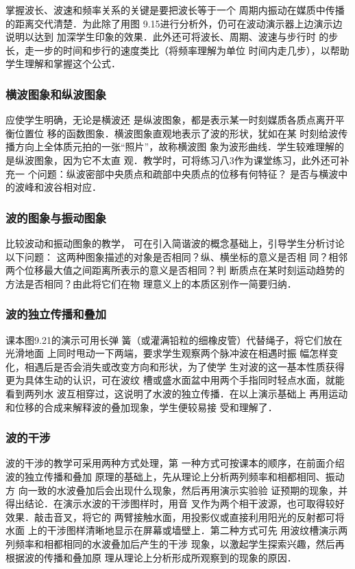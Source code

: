 掌握波长、波速和频率关系的关键是要把波长等于一个
周期内振动在媒质中传播的距离交代清楚．为此除了用图
9.15进行分析外，仍可在波动演示器上边演示边说明以达到
加深学生印象的效果．此外还可将波长、周期、波速与步行时
的步长，走一步的时间和步行的速度类比（将频率理解为单位
时间内走几步），以帮助学生理解和掌握这个公式．

\subsubsection{横波图象和纵波图象}

应使学生明确，无论是横波还
是纵波图象，都是表示某一时刻媒质各质点离开平衡位置位
移的函数图象．横波图象直观地表示了波的形状，犹如在某
时刻给波传播方向上全体质元拍的一张“照片”，故称横波图
象为波形曲线．学生较难理解的是纵波图象，因为它不太直
观．教学时，可将练习八3作为课堂练习，此外还可补充一
个问题：纵波密部中央质点和疏部中央质点的位移有何特征？
是否与横波中的波峰和波谷相对应．

\subsubsection{波的图象与振动图象} 

比较波动和振动图象的教学，
可在引入简谐波的概念基础上，引导学生分析讨论以下问题：
这两种图象描述的对象是否相同？纵、横坐标的意义是否相
同？相邻两个位移最大值之间距离所表示的意义是否相同？判
断质点在某时刻运动趋势的方法是否相同？由此将它们在物
理意义上的本质区别作一简要归纳．

\subsubsection{波的独立传播和叠加} 

课本图9.21的演示可用长弹
簧（或灌满铅粒的细橡皮管）代替绳子，将它们放在光滑地面
上同时甩动一下两端，要求学生观察两个脉冲波在相遇时振
幅怎样变化，相遇后是否会消失或改变方向和形状，为了使学
生对波的这一基本性质获得更为具体生动的认识，可在波纹
槽或盛水面盆中用两个手指同时轻点水面，就能看到两列水
波互相穿过，这说明了水波的独立传播．在以上演示基础上
再用运动和位移的合成来解释波的叠加现象，学生便较易接
受和理解了．

\subsubsection{波的干涉} 

波的干涉的教学可采用两种方式处理，第
一种方式可按课本的顺序，在前面介绍波的独立传播和叠加
原理的基础上，先从理论上分析两列频率和相都相同、振动方
向一致的水波叠加后会出现什么现象，然后再用演示实验验
证预期的现象，并得出结论．在演示水波的干涉图样时，用音
叉作为两个相干波源，也可取得较好效果．敲击音叉，将它的
两臂接触水面，用投影仪或直接利用阳光的反射都可将水面
上的干涉图样清晰地显示在屏幕或墙壁上．第二种方式可先
用波纹槽演示两列频率和相都相同的水波叠加后产生的干涉
现象，以激起学生探索兴趣，然后再根据波的传播和叠加原
理从理论上分析形成所观察到的现象的原因．

